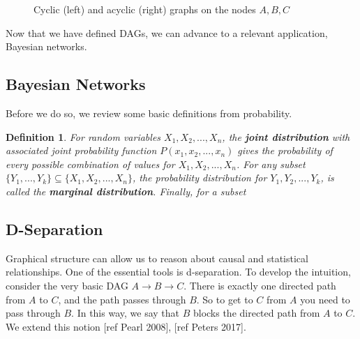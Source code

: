 \documentclass[12pt,twoside]{reedthesis}
\newtheorem{definition}{Definition}[section]
\theoremstyle{definition}
\begin{document}
\begin{figure}
\centering
{}

\caption{Cyclic (left) and acyclic (right) graphs on the nodes $A,B,C$} \label{fig:M1}
\end{figure}

Now that we have defined DAGs, we can advance to a relevant application, Bayesian networks.

\subsection{Bayesian Networks}

Before we do so, we review some basic definitions from probability.

\begin{definition}
For random variables $X_1, X_2, ..., X_n$, the \textbf{joint distribution} with associated joint probability function $P(x_1, x_2, ..., x_n)$ gives the probability of every possible combination of values for $X_1, X_2, ..., X_n$. For any subset $\{Y_1,...,Y_k\} \subseteq \{X_1, X_2, ..., X_n\}$, the probability distribution for $Y_1, Y_2, ..., Y_k$, is called the \textbf{marginal distribution}. Finally, for a subset 
\end{definition}



\subsection{D-Separation}
Graphical structure can allow us to reason about causal and statistical relationships. One of the essential tools is d-separation. To develop the intuition, consider the very basic DAG $A \rightarrow B \rightarrow C$. There is exactly one directed path from $A$ to $C$, and the path passes through $B$. So to get to $C$ from $A$ you need to pass through $B$. In this way, we say that $B$ blocks the directed path from $A$ to $C$. We extend this notion [ref Pearl 2008], [ref Peters 2017].
\end{document}
